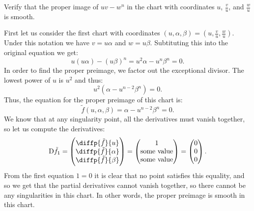 \documentclass[11pt, a4paper]{article}
\begin{document}
\begin{exercise}
  Verify that the proper image of $uv - w^n$ in the chart with coordinates
  $u$, $\frac{v}{u}$, and $\frac{w}{u}$ is smooth.
\end{exercise}
\begin{solution}
  First let us consider the first chart with coordinates
  $(u,\alpha,\beta) = (u,\frac{v}{u},\frac{w}{u})$.
  Under this notation we have $v = u \alpha$ and $w = u \beta$.
  Subtituting this into the original equation we get:
  \[
    u (u \alpha) - (u \beta)^n =
    u^2 \alpha - u^n \beta^n = 0.
  \]
  In order to find the proper preimage,
  we factor out the exceptional divisor.
  The lowest power of $u$ is $u^2$ and thus:
  \[
    u^2 (\alpha - u^{n-2} \beta^n) =
    0.
  \]
  Thus, the equation for the proper preimage of this chart is:
  \begin{equation}
    \label{eq:seven-four}
    \tilde f(u,\alpha,\beta) = \alpha - u^{n-2} \beta^n = 0.
  \end{equation}
  We know that at any singularity point,
  all the derivatives must vanish together,
  so let us compute the derivatives:
  \[
    \Dif \tilde f_1 =
    \begin{pmatrix}
      \diffp{{\tilde f}}{u} \\
      \diffp{{\tilde f}}{\alpha} \\
      \diffp{{\tilde f}}{\beta}
    \end{pmatrix} =
    \begin{pmatrix}
      1 \\
      \text{some value} \\
      \text{some value}
    \end{pmatrix} =
    \begin{pmatrix}
      0 \\ 0 \\ 0
    \end{pmatrix}.
  \]
  From the first equation $1 = 0$ it is clear that no point
  satisfies this equality, and so we get that the partial derivatives
  cannot vanish together,
  so there cannot be any singularities in this chart.
  In other words, the proper preimage is smooth in this chart.
\end{solution}
\end{document}
